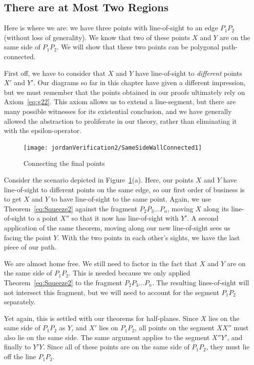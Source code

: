 \subsection{There are at Most Two Regions}\label{sec:SameSideEdgeConnected}
Here is where we are: we have three points with line-of-sight to an edge $P_1P_2$ (without loss of generality). We know that two of these points $X$ and $Y$ are on the same side of $P_1P_2$. We will show that these two points can be polygonal path-connected.

First off, we have to consider that $X$ and $Y$ have line-of-sight to \emph{different} points $X'$ and $Y'$. Our diagrams so far in this chapter have given a different impression, but we must remember that the points obtained in our proofs ultimately rely on Axiom~\ref{eq:g22}. This axiom allows us to extend a line-segment, but there are many possible witnesses for its existential conclusion, and we have generally allowed the abstraction to proliferate in our theory, rather than eliminating it with the epsilon-operator. 

\begin{figure}
\centering\texttt{[image: jordanVerification2/SameSideWallConnected1]}
\caption{Connecting the final points}
\label{fig:SameSideEdgeConnected}
\end{figure}

Consider the scenario depicted in Figure~\ref{fig:SameSideEdgeConnected}(a). Here, our points $X$ and $Y$ have line-of-sight to different points on the same edge, so our first order of business is to get $X$ and $Y$ to have line-of-sight to the same point. Again, we use Theorem~\ref{eq:Squeeze2} against the fragment $P_2P_3\ldots P_n$, moving $X$ along its line-of-sight to a point $X''$ so that it now has line-of-sight with $Y'$. A second application of the same theorem, moving along our new line-of-sight sees us facing the point $Y$. With the two points in each other's sights, we have the last piece of our path.

We are almost home free. We still need to factor in the fact that $X$ and $Y$ are on the same side of $P_1P_2$. This is needed because we only applied Theorem~\ref{eq:Squeeze2} to the fragment $P_2P_3\ldots P_n$. The resulting lines-of-sight will not intersect this fragment, but we will need to account for the segment $P_1P_2$ separately.

Yet again, this is settled with our theorems for half-planes. Since $X$ lies on the same side of $P_1P_2$ as $Y$, and $X'$ lies on $P_1P_2$, all points on the segment $XX''$ must also lie on the same side. The same argument applies to the segment $X''Y'$, and finally to $Y'Y$. Since all of these points are on the same side of $P_1P_2$, they must lie off the line $P_1P_2$. 

